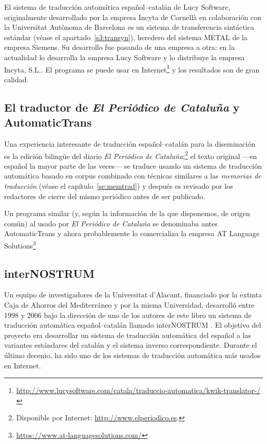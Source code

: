 El sistema de traducción automática español--catalán de Lucy Software, originalmente desarrollado por la empresa Incyta de Cornellà en colaboración con la Universitat Autònoma de Barcelona es un sistema de transferencia sintáctica estándar (véase el apartado~\ref{s3:transyn}), heredero del sistema METAL de la empresa Siemens. Su desarrollo fue pasando de una empresa a otra: en la actualidad lo desarrolla la empresa Lucy Software y lo distribuye la empresa Incyta, S.L.. El programa se puede usar en Internet\footnote{\url{http://www.lucysoftware.com/catala/traduccio-automatica/kwik-translator-/}} y los resultados son de gran calidad. 

\subsection{El traductor de \emph{El Periódico de Cataluña} y AutomaticTrans} \label{ss:ePdC} 

Una experiencia interesante \citep{fiteperiodico} de traducción español--catalán para la diseminación es la edición bilingüe del diario \emph{El Periódico de Cataluña};\footnote{Disponible por Internet: \url{http://www.elperiodico.es}.} el texto original ---en español la mayor parte de las veces--- se traduce usando un sistema de traducción automática basado en corpus combinado con técnicas similares a las \emph{memorias de traducción} (véase el capítulo~\ref{se:memtrad}) y después es revisado por los redactores de cierre del mismo periódico antes de ser publicado. 

Un programa similar (y, según la información de la que disponemos, de origen común) al usado por \emph{El Periódico de Cataluña} se denominaba antes AutomaticTrans y ahora probablemente lo comercializa la empresa AT Language Solutions\footnote{\url{https://www.at-languagesolutions.com/}} 

\subsection{interNOSTRUM} 

Un equipo de investigadores de la Universitat d'Alacant, financiado por la extinta Caja de Ahorros del Mediterráneo y por la misma Universidad, desarrolló entre 1998 y 2006 bajo la dirección de uno de los autores de este libro un sistema de traducción automática español--catalán llamado \textsf{interNOSTRUM} \citep{canals01a,canals01b}. El objetivo del proyecto era desarrollar un sistema de traducción automática del español a las variantes estándares del catalán y el sistema inverso correspondiente. Durante el último decenio, ha sido uno de los sistemas de traducción automática más usados en Internet. 

